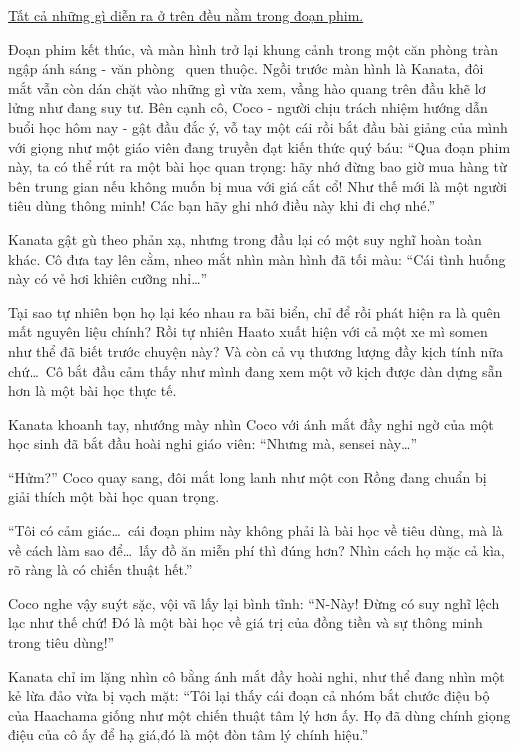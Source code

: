 \documentclass[../main.tex]{subfiles}
\begin{document}
\pov{-}

\begin{center}
  \uline{Tất cả những gì diễn ra ở trên đều nằm trong đoạn phim.}
\end{center}

Đoạn phim kết thúc, và màn hình trở lại khung cảnh trong một căn phòng tràn ngập ánh sáng - văn phòng \hll\ quen thuộc. Ngồi trước màn hình là Kanata, đôi mắt vẫn còn dán chặt vào những gì vừa xem, vầng hào quang trên đầu khẽ lơ lửng như đang suy tư. Bên cạnh cô, Coco - người chịu trách nhiệm hướng dẫn buổi học hôm nay - gật đầu đắc ý, vỗ tay một cái rồi bắt đầu bài giảng của mình với giọng như một giáo viên đang truyền đạt kiến thức quý báu: ``Qua đoạn phim này, ta có thể rút ra một bài học quan trọng: hãy nhớ đừng bao giờ mua hàng từ bên trung gian nếu không muốn bị mua với giá cắt cổ! Như thế mới là một người tiêu dùng thông minh! Các bạn hãy ghi nhớ điều này khi đi chợ nhé.''


Kanata gật gù theo phản xạ, nhưng trong đầu lại có một suy nghĩ hoàn toàn khác. Cô đưa tay lên cằm, nheo mắt nhìn màn hình đã tối màu: ``Cái tình huống này có vẻ hơi khiên cưỡng nhỉ\dots''

Tại sao tự nhiên bọn họ lại kéo nhau ra bãi biển, chỉ để rồi phát hiện ra là quên mất nguyên liệu chính? Rồi tự nhiên Haato xuất hiện với cả một xe mì somen như thể đã biết trước chuyện này? Và còn cả vụ thương lượng đầy kịch tính nữa chứ\dots\ Cô bắt đầu cảm thấy như mình đang xem một vở kịch được dàn dựng sẵn hơn là một bài học thực tế.

Kanata khoanh tay, nhướng mày nhìn Coco với ánh mắt đầy nghi ngờ của một học sinh đã bắt đầu hoài nghi giáo viên: ``Nhưng mà, sensei này\dots''

``Hửm?'' Coco quay sang, đôi mắt long lanh như một con Rồng đang chuẩn bị giải thích một bài học quan trọng.

``Tôi có cảm giác\dots\ cái đoạn phim này không phải là bài học về tiêu dùng, mà là về cách làm sao để\dots\ lấy đồ ăn miễn phí thì đúng hơn? Nhìn cách họ mặc cả kìa, rõ ràng là có chiến thuật hết.''

Coco nghe vậy suýt sặc, vội vã lấy lại bình tĩnh: ``N-Này! Đừng có suy nghĩ lệch lạc như thế chứ! Đó là một bài học về giá trị của đồng tiền và sự thông minh trong tiêu dùng!''

Kanata chỉ im lặng nhìn cô bằng ánh mắt đầy hoài nghi, như thể đang nhìn một kẻ lừa đảo vừa bị vạch mặt: ``Tôi lại thấy cái đoạn cả nhóm bắt chước điệu bộ của Haachama giống như một chiến thuật tâm lý hơn ấy. Họ đã dùng chính giọng điệu của cô ấy để hạ giá,đó là một đòn tâm lý chính hiệu.''
\end{document}

